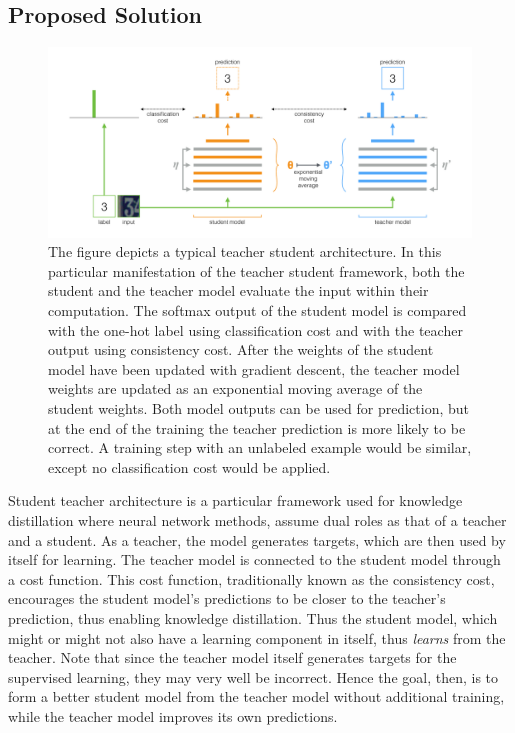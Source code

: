 \documentclass{article}
\begin{document}
\subsection{Proposed Solution}


\begin{figure}
 \includegraphics[width=0.95\linewidth]{mean_teacher.png}
    \vspace{-3mm}
    \caption{ The figure depicts a typical teacher student architecture. In this particular manifestation of the teacher student framework, both the student and the teacher model evaluate the input  within
their computation. The softmax output of the student model is compared with the one-hot label
using classification cost and with the teacher output using consistency cost. After the weights of the
student model have been updated with gradient descent, the teacher model weights are updated as an
exponential moving average of the student weights. Both model outputs can be used for prediction,
but at the end of the training the teacher prediction is more likely to be correct. A training step with
an unlabeled example would be similar, except no classification cost would be applied.}
  \label{fig:attention}
\vspace{-6mm}
\end{figure}



Student teacher architecture is a particular framework used for knowledge distillation where neural network methods, assume dual roles as that of a teacher and a student. As a teacher, the model generates targets, which are then used by itself for learning. The teacher model is connected to the student model through a cost function. This cost function, traditionally known as the consistency cost, encourages the student model's predictions to be closer to the teacher's prediction, thus enabling knowledge distillation. Thus the student model, which might or might not also have a learning component in itself, thus \textit{learns} from the teacher. Note that since the teacher model itself generates targets for the supervised learning, they may very well be incorrect. Hence the goal, then, is to form a better student model from the teacher model without additional training, while the teacher model improves its own predictions.
\end{document}
